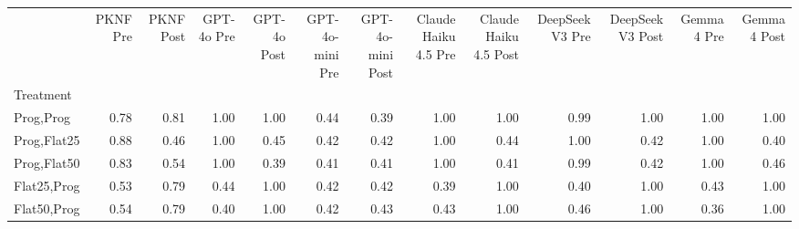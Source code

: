 \begin{tabular}{lrrrrrrrrrrrr}
\toprule
 & PKNF Pre & PKNF Post & GPT-4o Pre & GPT-4o Post & GPT-4o-mini Pre & GPT-4o-mini Post & Claude Haiku 4.5 Pre & Claude Haiku 4.5 Post & DeepSeek V3 Pre & DeepSeek V3 Post & Gemma 4 Pre & Gemma 4 Post \\
Treatment &  &  &  &  &  &  &  &  &  &  &  &  \\
\midrule
Prog,Prog & 0.78 & 0.81 & 1.00 & 1.00 & 0.44 & 0.39 & 1.00 & 1.00 & 0.99 & 1.00 & 1.00 & 1.00 \\
Prog,Flat25 & 0.88 & 0.46 & 1.00 & 0.45 & 0.42 & 0.42 & 1.00 & 0.44 & 1.00 & 0.42 & 1.00 & 0.40 \\
Prog,Flat50 & 0.83 & 0.54 & 1.00 & 0.39 & 0.41 & 0.41 & 1.00 & 0.41 & 0.99 & 0.42 & 1.00 & 0.46 \\
Flat25,Prog & 0.53 & 0.79 & 0.44 & 1.00 & 0.42 & 0.42 & 0.39 & 1.00 & 0.40 & 1.00 & 0.43 & 1.00 \\
Flat50,Prog & 0.54 & 0.79 & 0.40 & 1.00 & 0.42 & 0.43 & 0.43 & 1.00 & 0.46 & 1.00 & 0.36 & 1.00 \\
\bottomrule
\end{tabular}
